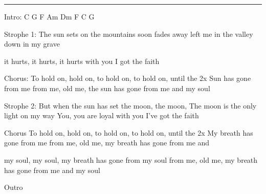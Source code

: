 \noindent\rule{\columnwidth}{1pt}

\begin{lstsong}
Intro: C G F Am Dm F C G

Strophe 1:
The sun sets on the mountains
soon fades away
left me in the valley
down in my grave

it hurts, it hurts, it hurts
with you I got the faith

Chorus:
To hold on, hold on, to hold on, to hold on, until the
2x Sun has gone from me
from me, old me, the sun has gone from me and my soul

Strophe 2:
But when the sun has set
the moon, the moon,
The moon is the only 
light on my way
You, you are loyal
with you I've got the faith

Chorus
To hold on, hold on, to hold on, to hold on, until the
2x My breath has gone from me
from me, old me, my breath has gone from me and 

my soul, my soul,
my breath has gone from my soul
from me, old me, my breath has gone from me and my soul

Outro
\end{lstsong}
\newpage

